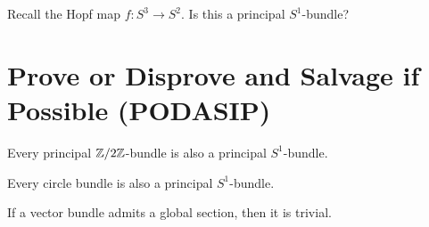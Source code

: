 \documentclass{homework}
\begin{document}
\begin{problem}
  Recall the Hopf map $f : S^3 \to S^2$.  Is this a principal $S^1$-bundle?
\end{problem}

\section{Prove or Disprove and Salvage if Possible (PODASIP)}

\begin{problem}
 Every principal $\mathbb{Z}/2\mathbb{Z}$-bundle is also a principal $S^1$-bundle. 
\end{problem}

\begin{problem} %
 Every circle bundle is also a principal $S^1$-bundle. 
\end{problem}

\begin{problem}
  If a vector bundle admits a global section, then it is trivial.
\end{problem}
\end{document}
